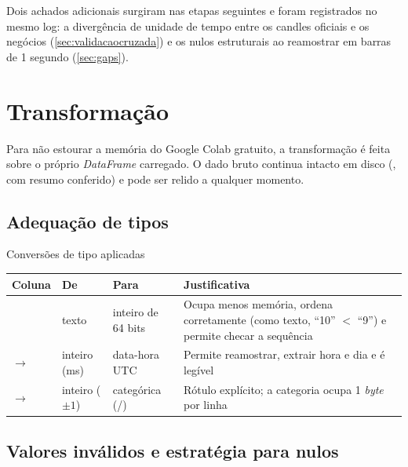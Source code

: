 Dois achados adicionais surgiram nas etapas seguintes e foram registrados no
mesmo log: a divergência de unidade de tempo entre os candles oficiais e os
negócios (\autoref{sec:validacaocruzada}) e os nulos estruturais ao reamostrar
em barras de 1 segundo (\autoref{sec:gaps}).

\section{Transformação}\label{sec:transformacao}

Para não estourar a memória do Google Colab gratuito, a transformação é feita
sobre o próprio \textit{DataFrame} carregado. O dado bruto continua intacto em
disco (, com resumo conferido) e pode ser relido a qualquer
momento.

\subsection{Adequação de tipos}\label{sec:tipos}

\begin{quadro}[htbp]
\caption{\label{qua:tipos}Conversões de tipo aplicadas}
\begin{corpotabela}
\begin{tabularx}{\textwidth}{|L{3.4cm}|L{2.2cm}|L{3.0cm}|Y|}
\hline
\textbf{Coluna} & \textbf{De} & \textbf{Para} & \textbf{Justificativa} \\ \hline
{} & texto & inteiro de 64 bits & Ocupa menos memória, ordena corretamente (como texto, ``10'' $<$ ``9'') e permite checar a sequência \\ \hline
{} $\rightarrow$  & inteiro (ms) & data-hora UTC & Permite reamostrar, extrair hora e dia e é legível \\ \hline
{} $\rightarrow$  & inteiro ($\pm 1$) & categórica (/) & Rótulo explícito; a categoria ocupa 1 \textit{byte} por linha \\ \hline
\end{tabularx}
\end{corpotabela}
\fonteautores[Elaborado]
\end{quadro}

\subsection{Valores inválidos e estratégia para nulos}\label{sec:nulos}

